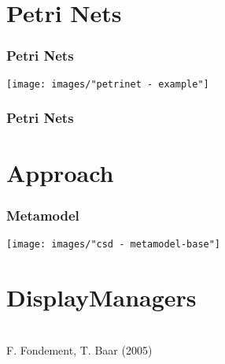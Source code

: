 \section*{Petri Nets}
\begin{frame}
  \frametitle{Petri Nets}

  \centering
  \hspace{-1cm}
  \texttt{[image: images/"petrinet - example"]}
\end{frame}

\begin{frame}
  \frametitle{Petri Nets}
  \hspace*{-.5cm}
\end{frame}


\section{Approach}
\begin{frame}
  \centering
  \hspace{-1cm}
  \huge
\end{frame}


\begin{frame}
  \frametitle{Metamodel}
  \centering
  \hspace{-1cm}
  \texttt{[image: images/"csd - metamodel-base"]}
  

\end{frame}

\section*{DisplayManagers}
\begin{frame}
  \hspace{-1cm}
  \large
   \\
  \hspace{-1cm}
  \small
  F. Fondement, T. Baar (2005)
\end{frame}


